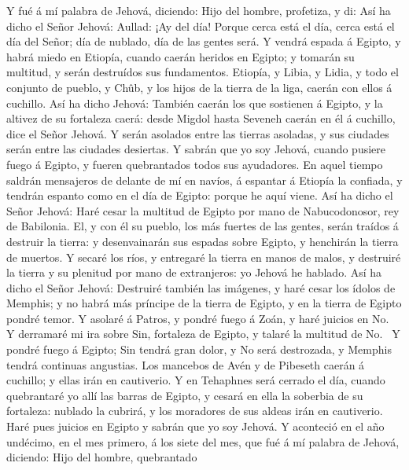  Y fué á mí palabra de Jehová, diciendo:  Hijo
del hombre, profetiza, y di: Así ha dicho el Señor Jehová: Aullad: ¡Ay
del día!  Porque cerca está el día, cerca está el día del
Señor; día de nublado, día de las gentes será.  Y vendrá
espada á Egipto, y habrá miedo en Etiopía, cuando caerán heridos en
Egipto; y tomarán su multitud, y serán destruídos sus fundamentos.
 Etiopía, y Libia, y Lidia, y todo el conjunto de pueblo, y
Chûb, y los hijos de la tierra de la liga, caerán con ellos á cuchillo.
 Así ha dicho Jehová: También caerán los que sostienen á
Egipto, y la altivez de su fortaleza caerá: desde Migdol hasta Seveneh
caerán en él á cuchillo, dice el Señor Jehová.  Y serán
asolados entre las tierras asoladas, y sus ciudades serán entre las
ciudades desiertas.  Y sabrán que yo soy Jehová, cuando
pusiere fuego á Egipto, y fueren quebrantados todos sus ayudadores.
 En aquel tiempo saldrán mensajeros de delante de mí en
navíos, á espantar á Etiopía la confiada, y tendrán espanto como en el
día de Egipto: porque he aquí viene.  Así ha dicho el Señor
Jehová: Haré cesar la multitud de Egipto por mano de Nabucodonosor, rey
de Babilonia.  El, y con él su pueblo, los más fuertes de
las gentes, serán traídos á destruir la tierra: y desenvainarán sus
espadas sobre Egipto, y henchirán la tierra de muertos.  Y
secaré los ríos, y entregaré la tierra en manos de malos, y destruiré la
tierra y su plenitud por mano de extranjeros: yo Jehová he hablado.
 Así ha dicho el Señor Jehová: Destruiré también las
imágenes, y haré cesar los ídolos de Memphis; y no habrá más príncipe de
la tierra de Egipto, y en la tierra de Egipto pondré temor.
 Y asolaré á Patros, y pondré fuego á Zoán, y haré juicios
en No.~ Y derramaré mi ira sobre Sin, fortaleza de Egipto,
y talaré la multitud de No.~ Y pondré fuego á Egipto; Sin
tendrá gran dolor, y No será destrozada, y Memphis tendrá continuas
angustias.  Los mancebos de Avén y de Pibeseth caerán á
cuchillo; y ellas irán en cautiverio.  Y en Tehaphnes será
cerrado el día, cuando quebrantaré yo allí las barras de Egipto, y
cesará en ella la soberbia de su fortaleza: nublado la cubrirá, y los
moradores de sus aldeas irán en cautiverio.  Haré pues
juicios en Egipto y sabrán que yo soy Jehová.  Y aconteció
en el año undécimo, en el mes primero, á los siete del mes, que fué á mí
palabra de Jehová, diciendo:  Hijo del hombre, quebrantado
